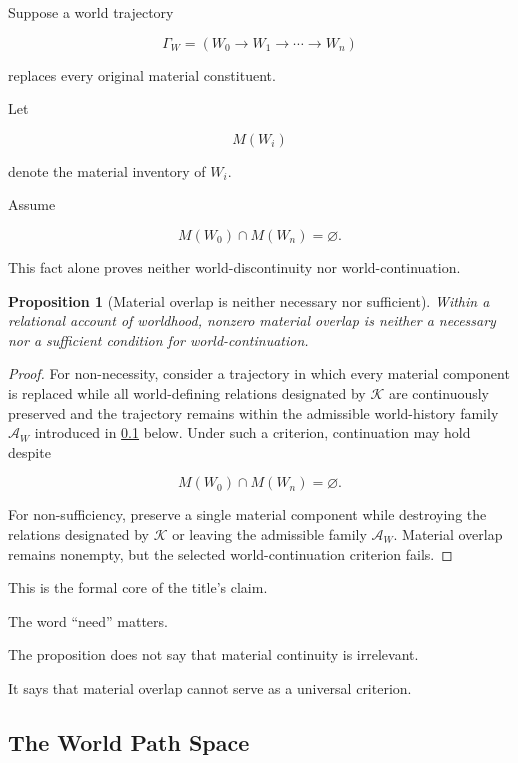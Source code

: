 \documentclass[
  11pt,
  a4paper,
  DIV=12,
  BCOR=0mm,
  parskip=half-
]{scrartcl}
\theoremstyle{definition}
\theoremstyle{plain}
\newtheorem{proposition}[definition]{Proposition}
\theoremstyle{remark}
\begin{document}
Suppose a world trajectory

\[
  \Gamma_W
  =
  (
    W_0\to W_1\to\cdots\to W_n
  )
\]

replaces every original material constituent.

Let

\[
  M(W_i)
\]

denote the material inventory of \(W_i\).

Assume

\[
  M(W_0)\cap M(W_n)=\varnothing.
\]

This fact alone proves neither world-discontinuity nor world-continuation.

\begin{proposition}[Material overlap is neither necessary nor sufficient]
\label{prop:material-overlap}
Within a relational account of worldhood, nonzero material overlap is neither
a necessary nor a sufficient condition for world-continuation.
\end{proposition}

\begin{proof}
For non-necessity, consider a trajectory in which every material component is
replaced while all world-defining relations designated by \(\mathcal K\) are
continuously preserved and the trajectory remains within the admissible
world-history family \(\mathcal A_W\) introduced in
\cref{app:world-path-space} below. Under such a criterion, continuation may
hold despite

\[
  M(W_0)\cap M(W_n)=\varnothing.
\]

For non-sufficiency, preserve a single material component while destroying the
relations designated by \(\mathcal K\) or leaving the admissible family
\(\mathcal A_W\). Material overlap remains nonempty, but the selected
world-continuation criterion fails.
\end{proof}

This is the formal core of the title's claim.

The word \enquote{need} matters.

The proposition does not say that material continuity is irrelevant.

It says that material overlap cannot serve as a universal criterion.


\subsection{The World Path Space}
\label{app:world-path-space}
\end{document}
